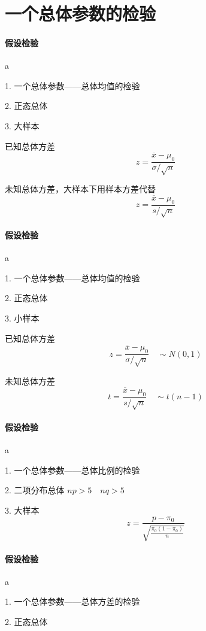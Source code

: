 \documentclass[UTF8,10pt]{book}
\begin{document}
    \section{一个总体参数的检验}
        \paragraph{假设检验} a
        
        1. 一个总体参数——总体均值的检验 

        2. 正态总体 

        3. 大样本	
        
        已知总体方差 $$ z = \frac{\overline{x}-\mu_0}{\sigma / \sqrt{n}} $$ 

        未知总体方差，大样本下用样本方差代替 $$ z = \frac{\overline{x}-\mu_0}{s / \sqrt{n}} $$

        \paragraph{假设检验} a
        
        1. 一个总体参数——总体均值的检验 
        
        2. 正态总体 
        
        3. 小样本	
        
        已知总体方差 $$ z = \frac{\overline{x}-\mu_0}{\sigma / \sqrt{n}} \quad \sim N(0,1)$$ 
        
        未知总体方差 $$ t = \frac{\overline{x}-\mu_0}{s / \sqrt{n}} \quad \sim t(n-1) $$
        
        \paragraph{假设检验} a
        
        1. 一个总体参数——总体比例的检验 
        
        2. 二项分布总体 $np>5 \quad nq>5$ 
        
        3. 大样本	
        $$ z = \frac{p-\pi_0}{ \sqrt{\frac{\pi_0(1-\pi_0)}{n}} } $$
        
        \paragraph{假设检验} a
        
        1. 一个总体参数——总体方差的检验 
        
        2. 正态总体 
        
\end{document}
